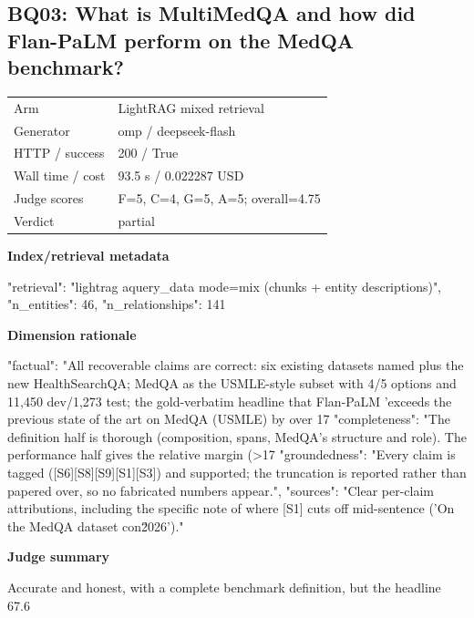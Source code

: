 \documentclass[10pt]{article}
\begin{document}
\subsection{BQ03: What is MultiMedQA and how did Flan-PaLM perform on the MedQA benchmark?}
\begin{tabular}{@{}ll@{}}
Arm & LightRAG mixed retrieval\\
Generator & omp / deepseek-flash\\
HTTP / success & 200 / True\\
Wall time / cost & 93.5 s / 0.022287 USD\\
Judge scores & F=5, C=4, G=5, A=5; overall=4.75\\
Verdict & partial\\
\end{tabular}

\textbf{Index/retrieval metadata}
\begin{EvidenceText}
{
  "retrieval": "lightrag aquery_data mode=mix (chunks + entity descriptions)",
  "n_entities": 46,
  "n_relationships": 141
}
\end{EvidenceText}

\textbf{Dimension rationale}
\begin{EvidenceText}
{
  "factual": "All recoverable claims are correct: six existing datasets named plus the new HealthSearchQA; MedQA as the USMLE-style subset with 4/5 options and 11,450 dev/1,273 test; the gold-verbatim headline that Flan-PaLM 'exceeds the previous state of the art on MedQA (USMLE) by over 17%
  "completeness": "The definition half is thorough (composition, spans, MedQA's structure and role). The performance half gives the relative margin (>17%
  "groundedness": "Every claim is tagged ([S6][S8][S9][S1][S3]) and supported; the truncation is reported rather than papered over, so no fabricated numbers appear.",
  "sources": "Clear per-claim attributions, including the specific note of where [S1] cuts off mid-sentence ('On the MedQA dataset con\u2026')."
}
\end{EvidenceText}

\textbf{Judge summary}
\begin{EvidenceText}
Accurate and honest, with a complete benchmark definition, but the headline 67.6%
\end{EvidenceText}
\end{document}
